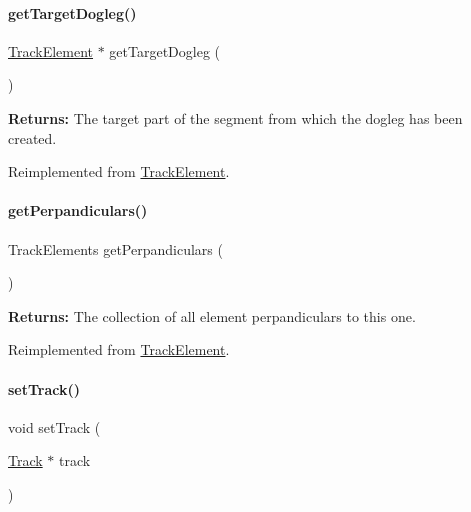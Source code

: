 \paragraph{\texorpdfstring{get\+Target\+Dogleg()}{getTargetDogleg()}}
{\footnotesize\ttfamily \hyperlink{classKite_1_1TrackElement}{Track\+Element} $\ast$ get\+Target\+Dogleg (\begin{DoxyParamCaption}{ }\end{DoxyParamCaption})\hspace{0.3cm}{\ttfamily [virtual]}}

{\bfseries Returns\+:} The target part of the segment from which the dogleg has been created. 

Reimplemented from \hyperlink{classKite_1_1TrackElement_aeb4e39bd925d093e6c45599433bb421c}{Track\+Element}.

\mbox{\label{classKite_1_1TrackSegment_aa0ba92ebf19f596537dc051c090d5736}} 
\paragraph{\texorpdfstring{get\+Perpandiculars()}{getPerpandiculars()}}
{\footnotesize\ttfamily Track\+Elements get\+Perpandiculars (\begin{DoxyParamCaption}{ }\end{DoxyParamCaption})\hspace{0.3cm}{\ttfamily [virtual]}}

{\bfseries Returns\+:} The collection of all element perpandiculars to this one. 

Reimplemented from \hyperlink{classKite_1_1TrackElement_aa0ba92ebf19f596537dc051c090d5736}{Track\+Element}.

\mbox{\label{classKite_1_1TrackSegment_abd3d8093f871d3d1a7f24b053648026c}} 
\paragraph{\texorpdfstring{set\+Track()}{setTrack()}}
{\footnotesize\ttfamily void set\+Track (\begin{DoxyParamCaption}\item[{\hyperlink{classKite_1_1Track}{Track} $\ast$}]{track }\end{DoxyParamCaption})\hspace{0.3cm}{\ttfamily [virtual]}}

